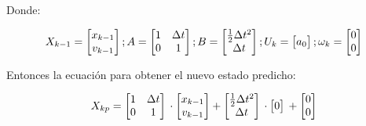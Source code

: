 Donde:

$$
X_{k-1} = \begin{bmatrix} x_{k-1} \\ v_{k-1} \\ \end{bmatrix}
;
A = \begin{bmatrix}
    1 & \Delta t  \\
    0 & 1         \\
    \end{bmatrix} \\
;
B = \begin{bmatrix}
    \frac{1}{2} \Delta t^2 \\
    \Delta t               \\
    \end{bmatrix}          \\
;
U_k = \begin{bmatrix} a_0 \\ \end{bmatrix} \\
;
\omega_k = \begin{bmatrix} 0 \\ 0 \\ \end{bmatrix}
$$

Entonces la ecuación para obtener el nuevo estado predicho:

$$
X_{kp} = 
    \begin{bmatrix}
    1 & \Delta t  \\
    0 & 1         \\
    \end{bmatrix} \\
    \cdot \begin{bmatrix} x_{k-1} \\ v_{k-1} \\ \end{bmatrix}
    +
    \begin{bmatrix}
    \frac{1}{2} \Delta t^2 \\
    \Delta t               \\
    \end{bmatrix}          \\
    \cdot
    \begin{bmatrix} 0 \\ \end{bmatrix} \\
    +
    \begin{bmatrix} 0 \\ 0 \\ \end{bmatrix}
$$ \\

